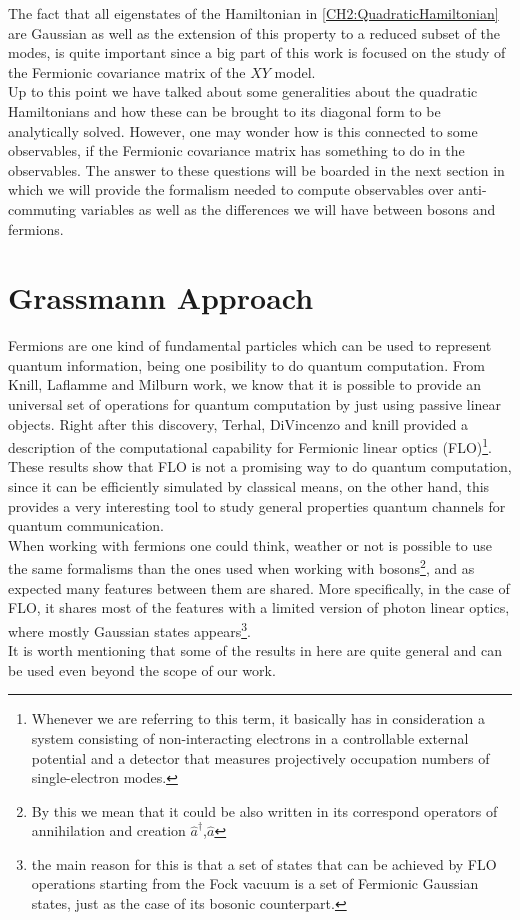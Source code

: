 \indent The fact that all eigenstates of the Hamiltonian in \eqref{CH2:QuadraticHamiltonian} are Gaussian as well as the extension of this property to a reduced subset of the modes, is quite important since a big part of this work is focused on the study of the Fermionic covariance matrix of the $XY$ model.\\
Up to this point we have talked about some generalities about the quadratic Hamiltonians and how these can be brought to its diagonal form to be analytically solved. However, one may wonder how is this connected to some observables, if the Fermionic covariance matrix has something to do in the observables. The answer to these questions will be boarded in the next section in which we will provide the formalism needed to compute observables over anti-commuting variables as well as the differences we will have between bosons and fermions.
\section{Grassmann Approach}
Fermions are one kind of fundamental particles which can be used to represent quantum information, being one posibility to do quantum computation. From Knill, Laflamme and Milburn\cite{knill_scheme_2001} work, we know that it is possible to provide an universal set of operations for quantum computation by just using passive linear objects. Right after this discovery, Terhal, DiVincenzo\cite{terhal_classical_2002} and knill\cite{knill_fermionic_2001} provided a description of the computational capability for Fermionic linear optics (FLO)\footnote{Whenever we are referring to this term, it basically has in consideration a system consisting of non-interacting electrons in a controllable external potential and a detector that measures projectively occupation numbers of single-electron modes.}. These results show that FLO is not a promising way to do quantum computation, since it can be efficiently simulated by classical means, on the other hand, this provides a very interesting tool to study general properties quantum channels for quantum communication.\\
\indent When working with fermions one could think, weather or not is possible to use the same formalisms than the ones used when working with bosons\footnote{By this we mean that it could be also written in its correspond operators of annihilation and creation $\hat{a}^{\dagger}$,$\hat{a}$\cite{noauthor_density_2007}}, and as expected many features between them are shared. More specifically, in the case of FLO, it shares most of the features with a limited version of photon linear optics, where mostly Gaussian states appears\cite{knill_scheme_2001}\footnote{the main reason for this is that a set of states that can be achieved by FLO operations starting from the Fock vacuum is a set of Fermionic Gaussian states, just as the case of its bosonic counterpart.}.\\
\indent It is worth mentioning that some of the results in here are quite general and can be used even beyond the scope of our work.

